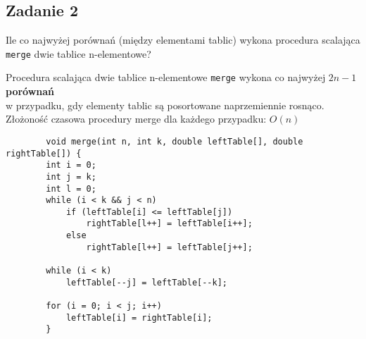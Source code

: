 \documentclass{article}
\begin{document}
    \subsection*{Zadanie 2}
    Ile co najwyżej porównań (między elementami tablic) wykona procedura scalająca \verb+merge+ dwie tablice n-elementowe?
    \begin{center}
        Procedura scalająca dwie tablice n-elementowe \verb+merge+ wykona co najwyżej $2n - 1$ \textbf{porównań} \\ 
        w przypadku, gdy elementy tablic są posortowane naprzemiennie rosnąco. \\
        Złożoność czasowa procedury merge dla każdego przypadku: $O(n)$
        \begin{lstlisting}
        void merge(int n, int k, double leftTable[], double rightTable[]) {
        int i = 0; 
        int j = k; 
        int l = 0; 
        while (i < k && j < n) 
            if (leftTable[i] <= leftTable[j]) 
                rightTable[l++] = leftTable[i++];
            else
                rightTable[l++] = leftTable[j++];

        while (i < k)
            leftTable[--j] = leftTable[--k];

        for (i = 0; i < j; i++)
            leftTable[i] = rightTable[i];
        }
        \end{lstlisting}
    \end{center}
    
\end{document}

